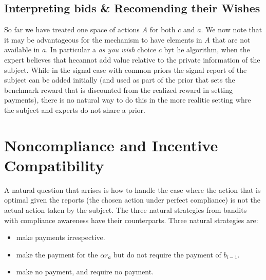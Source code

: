 

\subsection{Interpreting bids \& Recomending their Wishes}

So far we have treated one space of actions $A$ for both $c$ and $a$. We now note that it may be advantageous for the mechanism to have elements in $A$ that are not available in $a$. In particular a \emph{as you wish} choice $c$ byt he algorithm, when the expert believes that hecannot add value relative to the private information of the subject. While in the signal case with common priors the signal report of the subject can be added initially (and used as part of the prior that sets the benchmark reward that is discounted from the realized reward in setting payments), there is no natural way to do this in the more realitic setting whre the subject and experts do not share a prior.   



\section{Noncompliance and Incentive Compatibility}

A natural question that arrises is how to handle the case where the action that is optimal given the reports (the chosen action under perfect compliance) is not the actual action taken by the subject. The three natural strategies from bandits with compliance awareness have their counterparts. Three natural strategies are:

\begin{itemize}
\item make payments irrespective. 
\item make the payment for the $\alpha r_a$ but do not require the payment of $b_{i-1}$.
\item make no payment, and require no payment.
\end{itemize}

